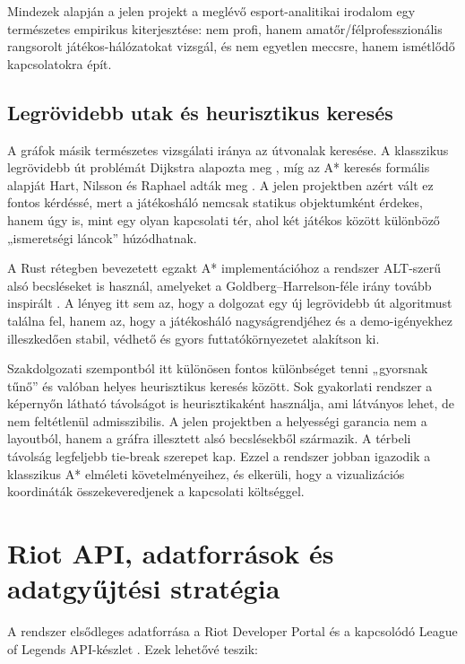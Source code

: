 ﻿\documentclass[a4paper,12pt]{report}
\begin{document}
Mindezek alapján a jelen projekt a meglévő esport-analitikai irodalom egy természetes empirikus kiterjesztése: nem profi, hanem amatőr/félprofesszionális rangsorolt játékos-hálózatokat vizsgál, és nem egyetlen meccsre, hanem ismétlődő kapcsolatokra épít.

\section{Legrövidebb utak és heurisztikus keresés}

A gráfok másik természetes vizsgálati iránya az útvonalak keresése. A klasszikus legrövidebb út problémát Dijkstra alapozta meg \cite{dijkstra1959}, míg az A* keresés formális alapját Hart, Nilsson és Raphael adták meg \cite{hart1968}. A jelen projektben azért vált ez fontos kérdéssé, mert a játékosháló nemcsak statikus objektumként érdekes, hanem úgy is, mint egy olyan kapcsolati tér, ahol két játékos között különböző „ismeretségi láncok” húzódhatnak.

A Rust rétegben bevezetett egzakt A* implementációhoz a rendszer ALT-szerű alsó becsléseket is használ, amelyeket a Goldberg--Harrelson-féle irány tovább inspirált \cite{goldberg2005}. A lényeg itt sem az, hogy a dolgozat egy új legrövidebb út algoritmust találna fel, hanem az, hogy a játékosháló nagyságrendjéhez és a demo-igényekhez illeszkedően stabil, védhető és gyors futtatókörnyezetet alakítson ki.

Szakdolgozati szempontból itt különösen fontos különbséget tenni „gyorsnak tűnő” és valóban helyes heurisztikus keresés között. Sok gyakorlati rendszer a képernyőn látható távolságot is heurisztikaként használja, ami látványos lehet, de nem feltétlenül admisszibilis. A jelen projektben a helyességi garancia nem a layoutból, hanem a gráfra illesztett alsó becslésekből származik. A térbeli távolság legfeljebb tie-break szerepet kap. Ezzel a rendszer jobban igazodik a klasszikus A* elméleti követelményeihez, és elkerüli, hogy a vizualizációs koordináták összekeveredjenek a kapcsolati költséggel.

\chapter{Riot API, adatforrások és adatgyűjtési stratégia}

A rendszer elsődleges adatforrása a Riot Developer Portal és a kapcsolódó League of Legends API-készlet \cite{riotportal,riotapi}. Ezek lehetővé teszik:
\end{document}
